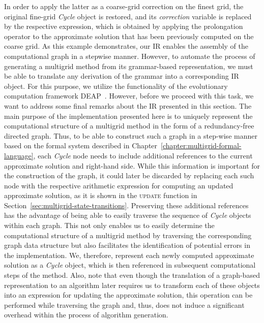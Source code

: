 In order to apply the latter as a coarse-grid correction on the finest grid, the original fine-grid \emph{Cycle} object is restored, and its \emph{correction} variable is replaced by the respective expression, which is obtained by applying the prolongation operator to the approximate solution that has been previously computed on the coarse grid.
As this example demonstrates, our IR enables the assembly of the computational graph in a stepwise manner.
However, to automate the process of generating a multigrid method from its grammar-based representation, we must be able to translate any derivation of the grammar into a corresponding IR object.
For this purpose, we utilize the functionality of the evolutionary computation framework DEAP~\cite{rainville2012deap}.
However, before we proceed with this task, we want to address some final remarks about the IR presented in this section.
The main purpose of the implementation presented here is to uniquely represent the computational structure of a multigrid method in the form of a redundancy-free directed graph.
Thus, to be able to construct such a graph in a step-wise manner based on the formal system described in Chapter~\ref{chapter:multigrid-formal-language}, each \emph{Cycle} node needs to include additional references to the current approximate solution and right-hand side.
While this information is important for the construction of the graph, it could later be discarded by replacing each such node with the respective arithmetic expression for computing an updated approximate solution, as it is shown in the \textsc{update} function in Section~\ref{sec:multigrid-state-transitions}.
Preserving these additional references has the advantage of being able to easily traverse the sequence of \emph{Cycle} objects within each graph.
This not only enables us to easily determine the computational structure of a multigrid method by traversing the corresponding graph data structure but also facilitates the identification of potential errors in the implementation.
We, therefore, represent each newly computed approximate solution as a \emph{Cycle} object, which is then referenced in subsequent computational steps of the method.
Also, note that even though the translation of a graph-based representation to an algorithm later requires us to transform each of these objects into an expression for updating the approximate solution, this operation can be performed while traversing the graph and, thus, does not induce a significant overhead within the process of algorithm generation.

